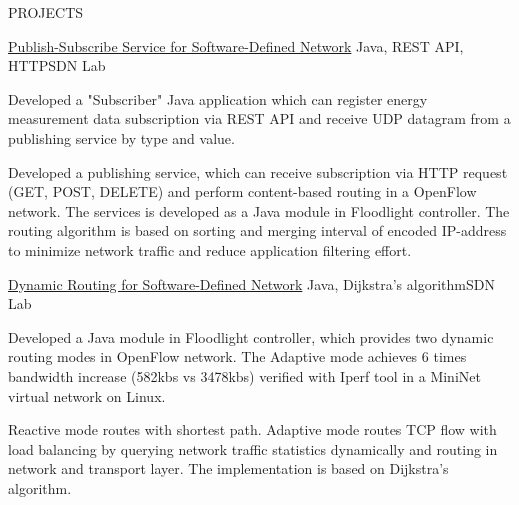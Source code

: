 \documentclass{resume} %
\begin{document}
\begin{rSection}{PROJECTS}
\begin{rSubsection}{\href{https://github.com/kuangyu0801/software-defined-networking-ws20/tree/main/sdn-assign-04}{Publish-Subscribe Service for Software-Defined Network}} { Java, REST API, HTTP}{SDN Lab}{} \\
\item Developed a "Subscriber" Java application which can register energy measurement data subscription via REST API and receive UDP datagram from a publishing service by type and value.
\item Developed a publishing service, which can receive subscription via HTTP request (GET, POST,  DELETE) and perform content-based routing in a OpenFlow network. The services is developed as a Java module in Floodlight controller. The routing algorithm is based on sorting and merging interval of encoded IP-address to minimize network traffic and reduce application filtering effort.
\end{rSubsection}

\begin{rSubsection}{\href{https://github.com/kuangyu0801/software-defined-networking-ws20/tree/main/sdn-assign-03}{Dynamic Routing for Software-Defined Network}} {Java, Dijkstra's algorithm}{SDN Lab}{} \\
\item Developed a Java module in Floodlight controller, which provides two dynamic routing modes in OpenFlow network. The Adaptive mode achieves 6 times bandwidth increase (582kbs vs 3478kbs) verified with Iperf tool in a MiniNet virtual network on Linux. 
\item Reactive mode routes with shortest path. Adaptive mode routes TCP flow with load balancing by querying network traffic statistics dynamically and routing in network and transport layer. The implementation is based on Dijkstra's algorithm.
\end{rSubsection}


\end{rSection}
\end{document}
